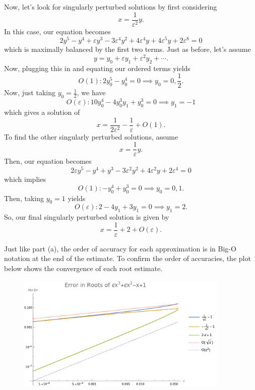 \documentclass[a4paper,12pt]{article}
\newcommand{\eps}{\varepsilon}
\begin{document}
\begin{enumerate}[label = \arabic*)]
\begin{enumerate}[label = (\alph*)]
    	Now, let's look for singularly perturbed solutions by first considering
    	\[
    		x = \frac{1}{\eps^2} y.
    	\]
    	In this case, our equation becomes
    	\[
    		2 y^5 - y^4 + \eps y^3 - 3 \eps^4 y^2 + 4 \eps^4 y + 4 \eps^5 y + 2 \eps^8 = 0
    	\]
    	which is maximally balanced by the first two terms. Just as before,
    	let's assume
    	\[
    		y = y_0 + \eps y_1 + \eps^2 y_2 + \cdots.
    	\]
    	Now, plugging this in and equating our ordered terms yields
    	\[
    			O(1): 2y_0^5 - y_0^4 = 0 \implies y_0 = 0, \frac{1}{2}.
    	\]
    	Now, just taking $ y_0 = \frac{1}{2} $, we have
    	\[
    		O(\eps): 10y_0^4 - 4y_0^3y_1 + y_0^3 = 0 \implies  y_1 = -1
    	\]
    	which gives a solution of 
    	\[
    		\boxed{x = \frac{1}{2\eps^2} - \frac{1}{\eps} + O(1).}
    	\]
    	To find the other singularly perturbed solutions, assume
    	\[
    		x = \frac{1}{\eps} y.
    	\]
    	Then, our equation becomes
    	\[
    		2 \eps y^5 - y^4 + y^3 - 3\eps^2 y^2 + 4 \eps^2 y + 2 \eps^4 = 0
    	\]
    	which implies
    	\[
    		O(1): -y_0^4 + y_0^3 = 0 \implies y_0 = 0, 1.
    	\]
    	Then, taking $ y_0 = 1 $ yields
    	\[
    		O(\eps): 2 - 4y_1 + 3y_1 = 0 \implies y_1 = 2.
    	\]
    	So, our final singularly perturbed solution is given by
    	\[
    		\boxed{x = \frac{1}{\eps} + 2 + O(\eps).}
    	\]
    	
    	Just like part (a), the order of accuracy for each approximation is in Big-O notation at the end of the estimate. To confirm the order of accuracies, the plot below shows the convergence of each root estimate.
    	
    	\newpage
    	\begin{figure}[h!]
    		\centering
    		\includegraphics[width = 0.9\textwidth]{Images/1a.png}
    	\end{figure}
    
    	\vspace{3cm}
    	

\end{enumerate}
\end{enumerate}
\end{document}
